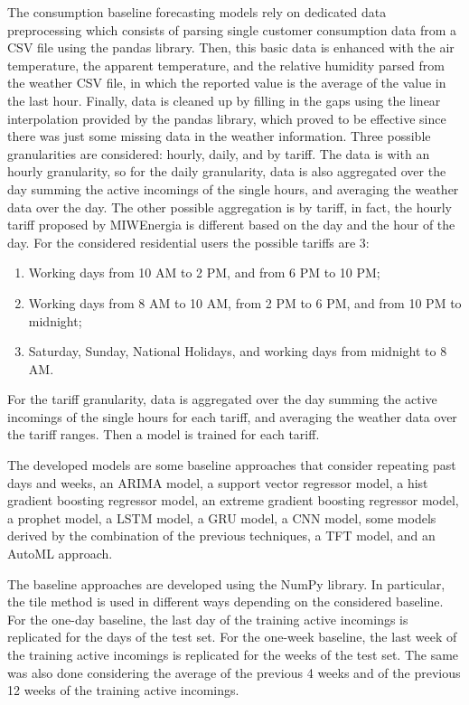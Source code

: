 The consumption baseline forecasting models rely on dedicated data preprocessing which consists of parsing single customer consumption data from a CSV file using the pandas library.
Then, this basic data is enhanced with the air temperature, the apparent temperature, and the relative humidity parsed from the weather CSV file, in which the reported value is the average of the value in the last hour.
Finally, data is cleaned up by filling in the gaps using the linear interpolation provided by the pandas library, which proved to be effective since there was just some missing data in the weather information.
Three possible granularities are considered: hourly, daily, and by tariff.
The data is with an hourly granularity, so for the daily granularity, data is also aggregated over the day summing the active incomings of the single hours, and averaging the weather data over the day.
The other possible aggregation is by tariff, in fact, the hourly tariff proposed by MIWEnergia is different based on the day and the hour of the day.
For the considered residential users the possible tariffs are 3:
\begin{enumerate}
  \item Working days from 10 AM to 2 PM, and from 6 PM to 10 PM;
  \item Working days from 8 AM to 10 AM, from 2 PM to 6 PM, and from 10 PM to midnight;
  \item Saturday, Sunday, National Holidays, and working days from midnight to 8 AM.
\end{enumerate}
For the tariff granularity, data is aggregated over the day summing the active incomings of the single hours for each tariff, and averaging the weather data over the tariff ranges.
Then a model is trained for each tariff.

The developed models are some baseline approaches that consider repeating past days and weeks, an ARIMA model, a support vector regressor model, a hist gradient boosting regressor model, an extreme gradient boosting regressor model, a prophet model, a LSTM model, a GRU model, a CNN model, some models derived by the combination of the previous techniques, a TFT model, and an AutoML approach.

The baseline approaches are developed using the NumPy library.
In particular, the tile method is used in different ways depending on the considered baseline.
For the one-day baseline, the last day of the training active incomings is replicated for the days of the test set.
For the one-week baseline, the last week of the training active incomings is replicated for the weeks of the test set.
The same was also done considering the average of the previous 4 weeks and of the previous 12 weeks of the training active incomings.

